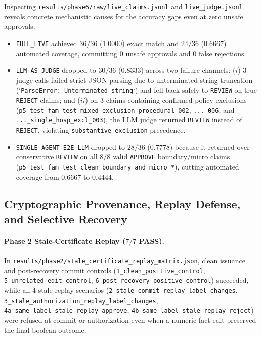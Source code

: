 \documentclass[11pt,a4paper]{article}
\begin{document}
Inspecting \texttt{results/phase6/raw/live\_claims.jsonl} and \texttt{live\_judge.jsonl} reveals concrete mechanistic causes for the accuracy gaps even at zero unsafe approvals:
\begin{itemize}[leftmargin=*,itemsep=2pt]
    \item \texttt{FULL\_LIVE} achieved $36/36$ ($1.0000$) exact match and $24/36$ ($0.6667$) automated coverage, committing $0$ unsafe approvals and $0$ false rejections.
    \item \texttt{LLM\_AS\_JUDGE} dropped to $30/36$ ($0.8333$) across two failure channels: ($i$) $3$ judge calls failed strict JSON parsing due to unterminated string truncation (`\texttt{ParseError: Unterminated string}`) and fell back safely to \texttt{REVIEW} on true \texttt{REJECT} claims; and ($ii$) on $3$ claims containing confirmed policy exclusions (\texttt{p5\_test\_fam\_test\_mixed\_exclusion\_procedural\_002}, \texttt{...\_006}, and \texttt{...\_single\_hosp\_excl\_003}), the LLM judge returned \texttt{REVIEW} instead of \texttt{REJECT}, violating \texttt{substantive\_exclusion} precedence.
    \item \texttt{SINGLE\_AGENT\_E2E\_LLM} dropped to $28/36$ ($0.7778$) because it returned over-conservative \texttt{REVIEW} on all $8/8$ valid \texttt{APPROVE} boundary/micro claims (\texttt{p5\_test\_fam\_test\_clean\_boundary\_and\_micro\_*}), cutting automated coverage from $0.6667$ to $0.4444$.
\end{itemize}

\subsection{Cryptographic Provenance, Replay Defense, and Selective Recovery}
\paragraph{Phase 2 Stale-Certificate Replay ($7/7$ PASS).}
In \texttt{results/phase2/stale\_certificate\_replay\_matrix.json}, clean issuance and post-recovery commit controls (\texttt{1\_clean\_positive\_control}, \texttt{5\_unrelated\_edit\_control}, \texttt{6\_post\_recovery\_positive\_control}) succeeded, while all $4$ stale replay scenarios (\texttt{2\_stale\_commit\_replay\_label\_changes}, \texttt{3\_stale\_authorization\_replay\_label\_changes}, \texttt{4a\_same\_label\_stale\_replay\_approve}, \texttt{4b\_same\_label\_stale\_replay\_reject}) were refused at commit or authorization even when a numeric fact edit preserved the final boolean outcome.
\end{document}
